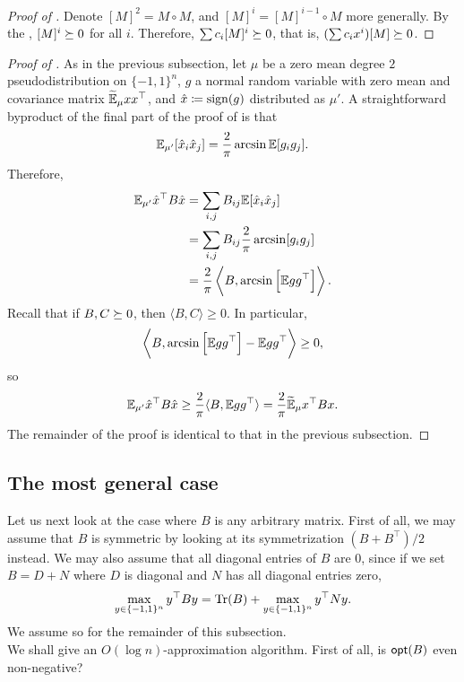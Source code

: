 	\begin{proof}[Proof of ]
		Denote $[M]^2 = M \circ M$, and $[M]^i = [M]^{i-1} \circ M$ more generally. By the , $[M]^i \succeq 0$ for all $i$. Therefore, $\sum c_i [M]^i \succeq 0$, that is, $(\sum c_i x^i)[M] \succeq 0$.
	\end{proof}


	\begin{proof}[Proof of ]
		As in the previous subsection, let $\mu$ be a zero mean degree $2$ pseudodistribution on $\{-1,1\}^n$, $g$ a normal random variable with zero mean and covariance matrix $\widetilde{\mathbb{E}}_\mu xx^\top$, and $\hat{x} \coloneqq \operatorname{sign}(g)$ distributed as $\mu'$. A straightforward byproduct of the final part of the proof of  is that
		\[ \mathbb{E}_{\mu'}[\hat{x}_i \hat{x}_j] = \frac{2}{\pi} \arcsin\mathbb{E}[g_ig_j]. \]
		Therefore,
		\begin{align*}
			\mathbb{E}_{\mu'} \hat{x}^\top B \hat{x} &= \sum_{i,j} B_{ij} \mathbb{E}[\hat{x}_i \hat{x}_j] \\
				&= \sum_{i,j} B_{ij} \frac{2}{\pi} \arcsin[g_i g_j] \\
				&= \frac{2}{\pi} \left\langle B , \arcsin\left[\mathbb{E} gg^\top\right] \right\rangle.
		\end{align*}
		Recall that if $B,C \succeq 0$, then $\langle B,C\rangle \ge 0$. In particular,
		\[ \left\langle B , \arcsin\left[\mathbb{E} gg^\top\right] - \mathbb{E} gg^\top \right\rangle \ge 0, \]
		so
		\[ \mathbb{E}_{\mu'} \hat{x}^\top B \hat{x} \ge \frac{2}{\pi} \langle B,\mathbb{E} gg^\top\rangle = \frac{2}{\pi} \widetilde{\mathbb{E}}_\mu x^\top B x. \]
		The remainder of the proof is identical to that in the previous subsection.
	\end{proof}



\subsection{The most general case}

	Let us next look at the case where $B$ is any arbitrary matrix. First of all, we may assume that $B$ is symmetric by looking at its symmetrization $(B+B^\top)/2$ instead.
	We may also assume that all diagonal entries of $B$ are $0$, since if we set $B = D + N$ where $D$ is diagonal and $N$ has all diagonal entries zero,
	\[ \max_{y \in \{-1,1\}^n} y^\top B y = \operatorname{Tr}(B) + \max_{y \in \{-1,1\}^n} y^\top N y. \]
	We assume so for the remainder of this subsection.\\
	We shall give an $O(\log n)$-approximation algorithm. First of all, is $\mathsf{opt}(B)$ even non-negative?

